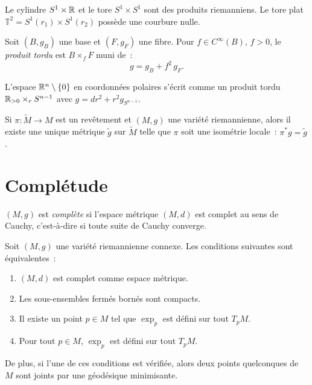 \begin{exemple}
Le cylindre $S^1 \times \mathbb{R}$ et le tore $S^1 \times S^1$ sont des produits riemanniens.
Le tore plat $\mathbb{T}^2 = S^1(r_1) \times S^1(r_2)$ poss\`ede une courbure nulle.
\end{exemple}

\begin{definition}
Soit $(B, g_B)$ une base et $(F, g_F)$ une fibre. Pour $f \in C^\infty(B)$, $f > 0$,
le \emph{produit tordu} est $B \times_f F$ muni de~:
\[
    g = g_B + f^2 \, g_F.
\]
\end{definition}

\begin{exemple}
L'espace $\mathbb{R}^n \setminus \{0\}$ en coordonn\'ees polaires s'\'ecrit comme un produit
tordu $\mathbb{R}_{>0} \times_r S^{n-1}$ avec $g = dr^2 + r^2 g_{S^{n-1}}$.
\end{exemple}

\begin{proposition}
Si $\pi : \widetilde{M} \to M$ est un rev\^etement et $(M, g)$ une vari\'et\'e
riemannienne, alors il existe une unique m\'etrique $\tilde{g}$ sur $\widetilde{M}$
telle que $\pi$ soit une isom\'etrie locale~: $\pi^* g = \tilde{g}$.
\end{proposition}

\section{Compl\'etude}

\begin{definition}
$(M, g)$ est \emph{compl\`ete} si l'espace m\'etrique $(M, d)$ est complet au sens
de Cauchy, c'est-\`a-dire si toute suite de Cauchy converge.
\end{definition}

\begin{theoreme}
\label{thm:hopf_rinow}
Soit $(M, g)$ une vari\'et\'e riemannienne connexe. Les conditions suivantes sont
\'equivalentes~:
\begin{enumerate}
    \item $(M, d)$ est complet comme espace m\'etrique.
    \item Les sous-ensembles ferm\'es born\'es sont compacts.
    \item Il existe un point $p \in M$ tel que $\exp_p$ est d\'efini sur tout $T_pM$.
    \item Pour tout $p \in M$, $\exp_p$ est d\'efini sur tout $T_pM$.
\end{enumerate}
De plus, si l'une de ces conditions est v\'erifi\'ee, alors deux points quelconques
de $M$ sont joints par une g\'eod\'esique minimisante.
\end{theoreme}

